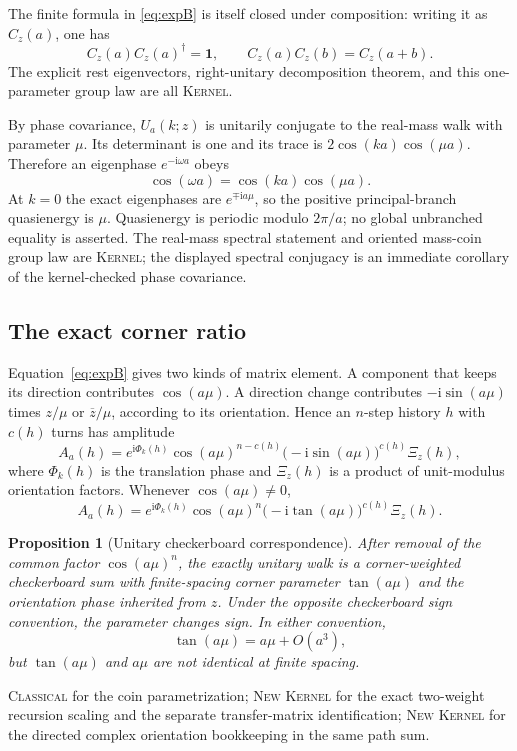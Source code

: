 \documentclass[11pt]{article}
\newcommand{\Kernel}{\textcolor{kernelcolor}{\textsc{Kernel}}}
\newcommand{\Classical}{\textcolor{classicalcolor}{\textsc{Classical}}}
\newcommand{\NewResult}{\textsc{New}}
\newcommand{\ii}{\mathrm{i}}
\newcommand{\id}{\mathbf{1}}
\newtheorem{proposition}[theorem]{Proposition}
\begin{document}
The finite formula in \eqref{eq:expB} is itself closed under composition:
writing it as $C_z(a)$, one has
\begin{equation}
 C_z(a)C_z(a)^\dagger=\id,
 \qquad
 C_z(a)C_z(b)=C_z(a+b).
\end{equation}
The explicit rest eigenvectors, right-unitary decomposition theorem, and this
one-parameter group law are all \Kernel{}.

By phase covariance, $U_a(k;z)$ is unitarily conjugate to the real-mass walk
with parameter $\mu$.  Its determinant is one and its trace is
$2\cos(ka)\cos(\mu a)$.  Therefore an eigenphase $e^{-\ii\omega a}$ obeys
\begin{equation}\label{eq:dispersion}
 \boxed{\cos(\omega a)=\cos(ka)\cos(\mu a)}.
\end{equation}
At $k=0$ the exact eigenphases are $e^{\mp\ii a\mu}$, so the positive
principal-branch quasienergy is $\mu$.  Quasienergy is periodic modulo
$2\pi/a$; no global unbranched equality is asserted.  The real-mass spectral
statement and oriented mass-coin group law are \Kernel{}; the displayed
spectral conjugacy is an immediate corollary of the kernel-checked phase
covariance.

\subsection{The exact corner ratio}

Equation~\eqref{eq:expB} gives two kinds of matrix element.  A component that
keeps its direction contributes $\cos(a\mu)$.  A direction change contributes
$-\ii\sin(a\mu)$ times $z/\mu$ or $\overline z/\mu$, according to its
orientation.  Hence an $n$-step history $h$ with $c(h)$ turns has amplitude
\begin{equation}\label{eq:pathweight}
 A_a(h)
 =e^{\ii\Phi_k(h)}
   \cos(a\mu)^{n-c(h)}
   \bigl(-\ii\sin(a\mu)\bigr)^{c(h)}
   \Xi_z(h),
\end{equation}
where $\Phi_k(h)$ is the translation phase and $\Xi_z(h)$ is a product of
unit-modulus orientation factors.  Whenever $\cos(a\mu)\neq0$,
\begin{equation}\label{eq:tanweight}
 A_a(h)
 =e^{\ii\Phi_k(h)}\cos(a\mu)^n
   \bigl(-\ii\tan(a\mu)\bigr)^{c(h)}\Xi_z(h).
\end{equation}

\begin{proposition}[Unitary checkerboard correspondence]\label{prop:tan}
After removal of the common factor $\cos(a\mu)^n$, the exactly unitary walk is
a corner-weighted checkerboard sum with finite-spacing corner parameter
$\tan(a\mu)$ and the orientation phase inherited from $z$.  Under the opposite
checkerboard sign convention, the parameter changes sign.  In either
convention,
\begin{equation}
 \tan(a\mu)=a\mu+O(a^3),
\end{equation}
but $\tan(a\mu)$ and $a\mu$ are not identical at finite spacing.
\end{proposition}
\noindent\Classical{} for the coin parametrization; \NewResult{} \Kernel{} for
the exact two-weight recursion scaling and the separate transfer-matrix
identification; \NewResult{} \Kernel{} for the directed complex orientation
bookkeeping in the same path sum.
\end{document}
